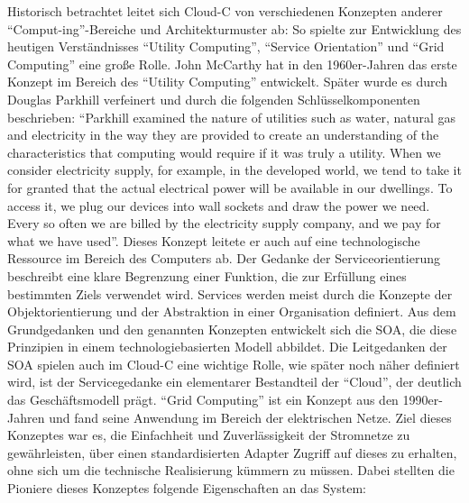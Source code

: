 Historisch betrachtet leitet sich \ac{Cloud-C} von verschiedenen Konzepten anderer \enquote{Comput-ing}-Bereiche und Architekturmuster ab: So spielte zur Entwicklung des heutigen Verständnisses \enquote{Utility Computing}, \enquote{Service Orientation} und \enquote{Grid Computing} eine große Rolle.\autocite[vgl.][S.\,3-5]{hill_guide_2013} John McCarthy hat in den 1960er-Jahren das erste Konzept im Bereich des \enquote{Utility Computing} entwickelt.\autocite[vgl.][]{mccarthy_reminiscences_1983} Später wurde es durch Douglas Parkhill verfeinert und durch die folgenden Schlüsselkomponenten beschrieben: \enquote{Parkhill examined the nature of utilities such as water, natural gas and electricity in the way they are provided to create an understanding of the characteristics that computing would require if it was truly a utility. When we consider electricity supply, for example, in the developed world, we tend to take it for granted that the actual electrical power will be available in our dwellings. To access it, we plug our devices into wall sockets and draw the power we need. Every so often we are billed by the electricity supply company, and we pay for what we have used}.\autocite[vgl.][]{parkhill_challenge_1966} Dieses Konzept leitete er auch auf eine technologische Ressource im Bereich des Computers ab.\autocite[vgl.][S.\,4]{hill_guide_2013} Der Gedanke der Serviceorientierung beschreibt eine klare Begrenzung einer Funktion, die zur Erfüllung eines bestimmten Ziels verwendet wird. Services werden meist durch die Konzepte der Objektorientierung und der Abstraktion in einer Organisation definiert. Aus dem Grundgedanken und den genannten Konzepten entwickelt sich die \ac{SOA}, die diese Prinzipien in einem technologiebasierten Modell abbildet. Die Leitgedanken der \ac{SOA} spielen auch im \ac{Cloud-C} eine wichtige Rolle, wie später noch näher definiert wird, ist der Servicegedanke ein elementarer Bestandteil der \enquote{Cloud}, der deutlich das Geschäftsmodell prägt. \enquote{Grid Computing} ist ein Konzept aus den 1990er-Jahren und fand seine Anwendung im Bereich der elektrischen Netze.\autocite[vgl.][]{weinhardt_cloud_2009} Ziel dieses Konzeptes war es, die Einfachheit und Zuverlässigkeit der Stromnetze zu gewährleisten, über einen standardisierten Adapter Zugriff auf dieses zu erhalten, ohne sich um die technische Realisierung kümmern zu müssen. Dabei stellten die Pioniere dieses Konzeptes folgende Eigenschaften\autocite[vgl.][]{foster_grid_1999} an das System:

